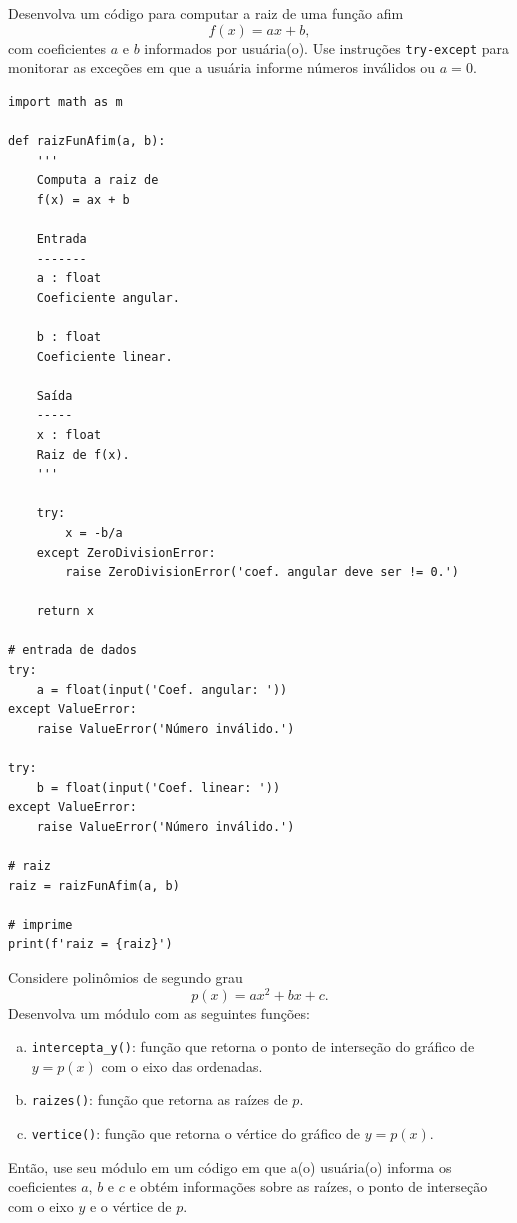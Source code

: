 \begin{exer}
  Desenvolva um código para computar a raiz de uma função afim
  \begin{equation}
    f(x) = ax + b,
  \end{equation}
  com coeficientes $a$ e $b$ informados por usuária(o). Use instruções \lstinline+try-except+ para monitorar as exceções em que a usuária informe números inválidos ou $a=0$.
\end{exer}
\begin{resp}

\begin{lstlisting}
import math as m

def raizFunAfim(a, b):
    '''
    Computa a raiz de
    f(x) = ax + b

    Entrada
    -------
    a : float
    Coeficiente angular.

    b : float
    Coeficiente linear.

    Saída
    -----
    x : float
    Raiz de f(x).
    '''
    
    try:
        x = -b/a
    except ZeroDivisionError:
        raise ZeroDivisionError('coef. angular deve ser != 0.')

    return x

# entrada de dados
try:
    a = float(input('Coef. angular: '))
except ValueError:
    raise ValueError('Número inválido.')

try:
    b = float(input('Coef. linear: '))
except ValueError:
    raise ValueError('Número inválido.')

# raiz
raiz = raizFunAfim(a, b)

# imprime
print(f'raiz = {raiz}')
\end{lstlisting}

\end{resp}

\begin{exer}
  Considere polinômios de segundo grau
  \begin{equation}
    p(x) = ax^2 + bx + c.
  \end{equation}
  Desenvolva um módulo com as seguintes funções:
  \begin{enumerate}[a)]
  \item \lstinline+intercepta_y()+: função que retorna o ponto de interseção do gráfico de $y = p(x)$ com o eixo das ordenadas.
  \item \lstinline+raizes()+: função que retorna as raízes de $p$.
  \item \lstinline+vertice()+: função que retorna o vértice do gráfico de $y=p(x)$.
  \end{enumerate}
  Então, use seu módulo em um código em que a(o) usuária(o) informa os coeficientes $a$, $b$ e $c$ e obtém informações sobre as raízes, o ponto de interseção com o eixo $y$ e o vértice de $p$. 
\end{exer}

